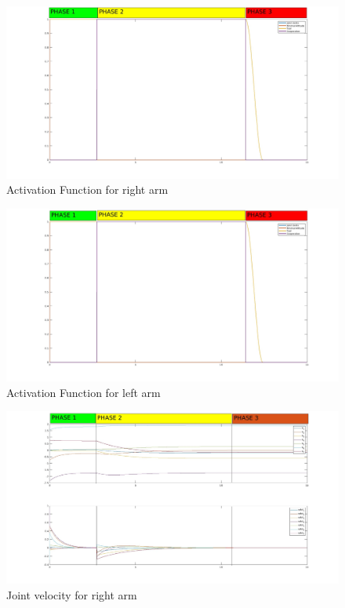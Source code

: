 \documentclass{article}
\begin{document}
\begin{figure}[h]
	\centering
	\includegraphics[width=1\textwidth]{imgs/ex3/activation right.jpg}
	\caption{\label{fig:1} Activation Function for right arm}
\end{figure}
\begin{figure}[h]
	\centering
	\includegraphics[width=1\textwidth]{imgs/ex3/activation left.jpg}
	\caption{\label{fig:1} Activation Function for left arm}
\end{figure}

\begin{figure}[h]
	\centering
	\includegraphics[width=1\textwidth]{imgs/ex3/joint velocity right neither.jpg}
	\caption{\label{fig:1} Joint velocity for right arm}
\end{figure}
\end{document}
